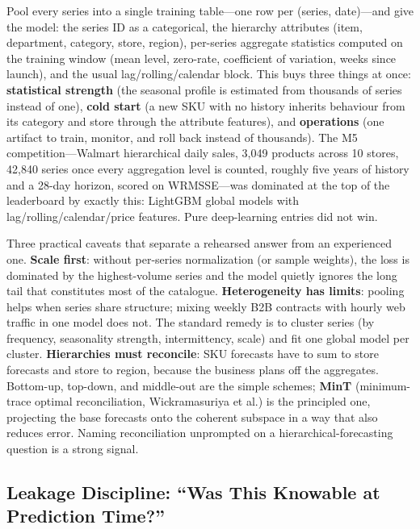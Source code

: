 \begin{keyinsight}
Pool every series into a single training table---one row per (series, date)---and give the model: the series ID as a categorical, the hierarchy attributes (item, department, category, store, region), per-series aggregate statistics computed on the training window (mean level, zero-rate, coefficient of variation, weeks since launch), and the usual lag/rolling/calendar block. This buys three things at once: \textbf{statistical strength} (the seasonal profile is estimated from thousands of series instead of one), \textbf{cold start} (a new SKU with no history inherits behaviour from its category and store through the attribute features), and \textbf{operations} (one artifact to train, monitor, and roll back instead of thousands). The M5 competition---Walmart hierarchical daily sales, 3{,}049 products across 10 stores, 42{,}840 series once every aggregation level is counted, roughly five years of history and a 28-day horizon, scored on WRMSSE---was dominated at the top of the leaderboard by exactly this: LightGBM global models with lag/rolling/calendar/price features. Pure deep-learning entries did not win.
\end{keyinsight}

Three practical caveats that separate a rehearsed answer from an experienced one. \textbf{Scale first}: without per-series normalization (or sample weights), the loss is dominated by the highest-volume series and the model quietly ignores the long tail that constitutes most of the catalogue. \textbf{Heterogeneity has limits}: pooling helps when series share structure; mixing weekly B2B contracts with hourly web traffic in one model does not. The standard remedy is to cluster series (by frequency, seasonality strength, intermittency, scale) and fit one global model per cluster. \textbf{Hierarchies must reconcile}: SKU forecasts have to sum to store forecasts and store to region, because the business plans off the aggregates. Bottom-up, top-down, and middle-out are the simple schemes; \textbf{MinT} (minimum-trace optimal reconciliation, Wickramasuriya et al.) is the principled one, projecting the base forecasts onto the coherent subspace in a way that also reduces error. Naming reconciliation unprompted on a hierarchical-forecasting question is a strong signal.

\subsection{Leakage Discipline: ``Was This Knowable at Prediction Time?''}

